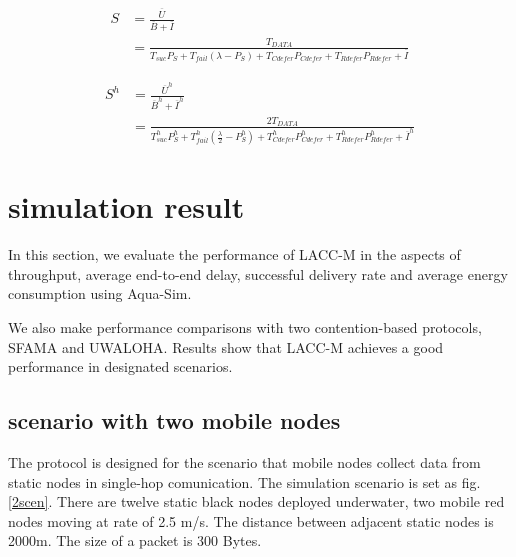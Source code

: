 \documentclass[conference]{IEEEtran}
\begin{document}
\begin{figure}[!h]
	
	\normalsize
	
	\setcounter{mytempeqncnt}{\value{equation}}
	
	
	\begin{equation}
	\begin{aligned}
	S&=\frac{\overline U}{\overline B+\overline I}\\&=\frac{T_{DATA}}{ T_{suc}P_S+T_{fail}(\lambda-P_S )+ T_{Cdefer}P_{Cdefer}+T_{Rdefer}P_{Rdefer}+\overline I}
	\end{aligned}
	\label{s1}
	\end{equation}
	
	\begin{equation}
	\begin{aligned}
	S^h&=\frac{\overline U^h}{\overline B^h+\overline I^h}\\&=\frac{2T_{DATA}}{ T_{suc}^h P_S^h+T_{fail}^h(\frac{\lambda}{2}-P_S^h )+ T_{Cdefer}^hP_{Cdefer}^h+T_{Rdefer}^hP_{Rdefer}^h+\overline I^h}
	\end{aligned}
	\label{s2}
	\end{equation}
	\setcounter{equation}{\value{mytempeqncnt}}
	
	\hrulefill
	
	\vspace*{4pt}
	
\end{figure}

\section{simulation result}

In this section, we evaluate the performance of LACC-M in the aspects of throughput, average end-to-end delay, successful delivery rate and average energy consumption using Aqua-Sim\cite{xie2009aqua}. 

We also make performance comparisons with two contention-based protocols, SFAMA\cite{molins2007slotted} and UWALOHA\cite{de2011characterization}. Results show that LACC-M achieves a good performance in designated scenarios.

\subsection{scenario with two mobile nodes}
The protocol is designed for the scenario that mobile nodes collect data from static nodes in single-hop comunication. The simulation scenario is set as fig.\ref{2scen}. There are twelve static black nodes deployed underwater, two mobile red nodes moving at rate of 2.5 m/s. The distance between adjacent static nodes is 2000m. The size of a packet is 300 Bytes.
\end{document}
